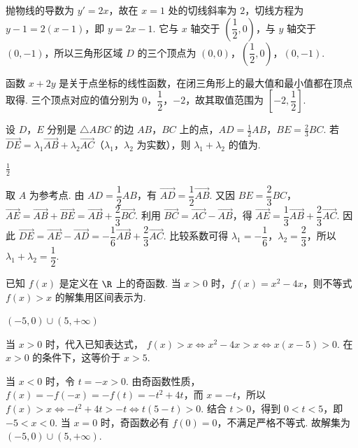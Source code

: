 \begin{solution}
抛物线的导数为 \(y'=2x\)，故在 \(x=1\) 处的切线斜率为 \(2\)，切线方程为 \(y-1=2(x-1)\)，即 \(y=2x-1\). 它与 \(x\) 轴交于 \(\left(\dfrac12,0\right)\)，与 \(y\) 轴交于 \((0,-1)\)，所以三角形区域 \(D\) 的三个顶点为 \((0,0)\)，\(\left(\dfrac12,0\right)\)，\((0,-1)\).

函数 \(x+2y\) 是关于点坐标的线性函数，在闭三角形上的最大值和最小值都在顶点取得. 三个顶点对应的值分别为 \(0\)，\(\dfrac12\)，\(-2\)，故其取值范围为 \(\left[-2,\dfrac12\right]\).
\end{solution}

\begin{problem}
设 \(D\)，\(E\) 分别是 \(\triangle ABC\) 的边 \(AB\)，\(BC\) 上的点，\(AD=\frac{1}{2}AB\)，\(BE=\frac{2}{3}BC\). 若 \(\overrightarrow{DE}=\lambda_1\overrightarrow{AB}+\lambda_2\overrightarrow{AC}\)（\(\lambda_1\)，\(\lambda_2\) 为实数），则 \(\lambda_1+\lambda_2\) 的值为\fillinblank{}.
\end{problem}

\begin{answer}
\(\frac{1}{2}\)
\end{answer}

\begin{solution}
取 \(A\) 为参考点. 由 \(AD=\dfrac12AB\)，有 \(\overrightarrow{AD}=\dfrac12\overrightarrow{AB}\). 又因 \(BE=\dfrac23BC\)，
\(\overrightarrow{AE}=\overrightarrow{AB}+\overrightarrow{BE}=\overrightarrow{AB}+\dfrac23\overrightarrow{BC}\). 利用 \(\overrightarrow{BC}=\overrightarrow{AC}-\overrightarrow{AB}\)，得
\(\overrightarrow{AE}=\dfrac13\overrightarrow{AB}+\dfrac23\overrightarrow{AC}\). 因此
\(\overrightarrow{DE}=\overrightarrow{AE}-\overrightarrow{AD}=-\dfrac16\overrightarrow{AB}+\dfrac23\overrightarrow{AC}\). 比较系数可得 \(\lambda_1=-\dfrac16\)，\(\lambda_2=\dfrac23\)，所以 \(\lambda_1+\lambda_2=\dfrac12\).
\end{solution}

\begin{problem}
已知 \(f(x)\) 是定义在 \(\R\) 上的奇函数. 当 \(x>0\) 时，\(f(x)=x^2-4x\)，则不等式 \(f(x)>x\) 的解集用区间表示为\fillinblank{}.
\end{problem}

\begin{answer}
\((-5,0)\cup(5,+\infty)\)
\end{answer}

\begin{solution}
当 \(x>0\) 时，代入已知表达式，
\(f(x)>x\iff x^2-4x>x\iff x(x-5)>0\). 在 \(x>0\) 的条件下，这等价于 \(x>5\).

当 \(x<0\) 时，令 \(t=-x>0\). 由奇函数性质，\(f(x)=-f(-x)=-f(t)=-t^2+4t\)，而 \(x=-t\)，所以
\(f(x)>x\iff -t^2+4t>-t\iff t(5-t)>0\). 结合 \(t>0\)，得到 \(0<t<5\)，即 \(-5<x<0\). 当 \(x=0\) 时，奇函数必有 \(f(0)=0\)，不满足严格不等式. 故解集为 \((-5,0)\cup(5,+\infty)\).
\end{solution}

